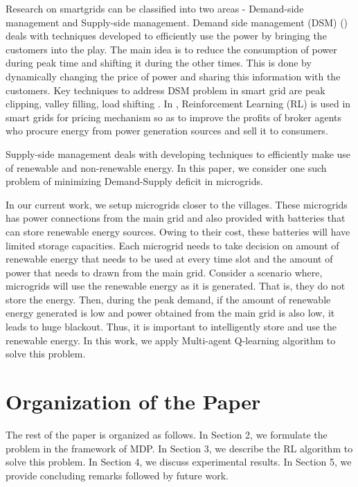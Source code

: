\documentclass[conference]{IEEEtran}
\begin{document}
Research on smartgrids can be classified into two areas -  Demand-side management and Supply-side management. Demand side management (DSM) (\cite{logenthiran2011multi, wang2010demand,dsm1,dsm2,dsm3,dsm4}) deals with techniques developed to efficiently use the power by bringing the customers into the play. The main idea is to reduce the consumption of power during peak time and shifting it during the other times. This is done by dynamically changing the price of power and sharing this information with the customers. Key techniques to address DSM problem in smart grid are peak clipping, valley filling,  load shifting \cite{maharjan2010demand}. In \cite{reddy2011learned, reddy2011strategy}, Reinforcement Learning (RL) \cite{sutton} is used in smart grids for pricing mechanism so as to improve the profits of broker agents who procure energy from power generation sources and sell it to consumers.  

Supply-side management deals with developing techniques to efficiently make use of renewable and non-renewable energy. In this paper, we consider one such problem of minimizing Demand-Supply deficit in microgrids. 

In our current work, we setup microgrids closer to the villages. These microgrids has power connections from the main grid and also provided with batteries that can store renewable energy sources. Owing to their cost, these batteries will have limited storage capacities. Each microgrid needs to take decision on amount of renewable energy that needs to be used at every time slot and the amount of power that needs to drawn from the main grid. Consider a scenario where, microgrids will use the renewable energy as it is generated. That is, they do not store the energy. Then, during the peak demand, if the amount of renewable energy generated is low and power obtained from the main grid is also low, it leads to huge blackout. Thus, it is important to intelligently store and use the renewable energy. In this work, we apply Multi-agent Q-learning algorithm to solve this problem. 

\section*{Organization of the Paper}	
The rest of the paper is organized as follows. In Section 2, we formulate the problem in the framework of MDP. In Section 3, we describe the RL algorithm to solve this problem. In Section 4, we discuss experimental results. In Section 5, we provide concluding remarks followed by future work.
\end{document}
